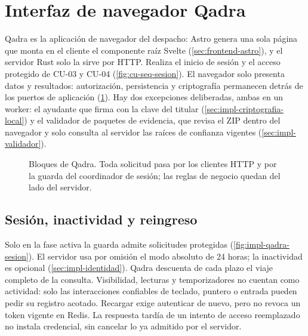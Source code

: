 
\section{Interfaz de navegador Qadra}\label{sec:impl-http-interfaz}

Qadra es la aplicación de navegador del despacho: Astro genera una sola página que monta en el cliente el componente raíz Svelte (\cref{sec:frontend-astro}), y el servidor Rust solo la sirve por HTTP. Realiza el inicio de sesión y el acceso protegido de CU-03 y CU-04 (\cref{fig:cu-seq-sesion}). El navegador solo presenta datos y resultados: autorización, persistencia y criptografía permanecen detrás de los puertos de aplicación (\cref{fig:impl-qadra-bloques}). Hay dos excepciones deliberadas, ambas en un worker: el ayudante que firma con la clave del titular (\cref{sec:impl-criptografia-local}) y el validador de paquetes de evidencia, que revisa el ZIP dentro del navegador y solo consulta al servidor las raíces de confianza vigentes (\cref{sec:impl-validador}).

\begin{figure}[!htbp]
  \centering
  
  \caption{Bloques de Qadra. Toda solicitud pasa por los clientes HTTP y por la guarda del coordinador de sesión; las reglas de negocio quedan del lado del servidor.}
  \label{fig:impl-qadra-bloques}
\end{figure}

\subsection{Sesión, inactividad y reingreso}\label{sec:impl-qadra-sesion}

Solo en la fase activa la guarda admite solicitudes protegidas (\cref{fig:impl-qadra-sesion}). El servidor usa por omisión el modo absoluto de 24 horas; la inactividad es opcional (\cref{sec:impl-identidad}). Qadra descuenta de cada plazo el viaje completo de la consulta. Visibilidad, lecturas y temporizadores no cuentan como actividad: solo las interacciones confiables de teclado, puntero o entrada pueden pedir su registro acotado. Recargar exige autenticar de nuevo, pero no revoca un token vigente en Redis. La respuesta tardía de un intento de acceso reemplazado no instala credencial, sin cancelar lo ya admitido por el servidor.


